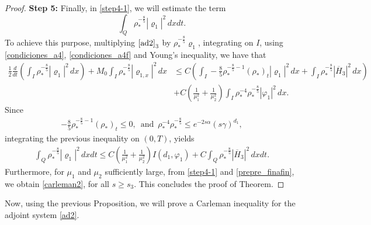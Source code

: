 \documentclass[11pt,a4paper]{amsart}
\numberwithin{equation}{section}
\begin{document}
\begin{proof}
\textbf{Step 5:} Finally, in \eqref{step4-1}, we will estimate the term
\begin{equation*}
\int_{Q}\rho^{-\frac{8}{5}}_{*}|\varrho_{1}|^{2}\,dxdt.
\end{equation*}To achieve this purpose, multiplying   $\eqref{ad2}_{3}$  by  $\rho^{-\frac{8}{5}}_{*}\varrho_{1}$, integrating on $I$, using \eqref{condiciones_a4}, \eqref{condiciones_a4f} and Young's inequality, we have that
\begin{equation*}
    \begin{split}
       \frac{1}{2}\frac{d}{dt}\left(\int_{I}\rho^{-\frac{8}{5}}_{*}|\varrho_{1}|^{2}\,dx \right)+M_{0}\int_{I}\rho^{-\frac{8}{5}}_{*}|\varrho_{1,x}|^{2}\,dx &\leq C \left(\int_{I}-\frac{8}{5}\rho^{-\frac{8}{5}-1}_{*}\left( \rho_{*}\right)_{t}|\varrho_{1}|^{2}\,dx+\int_{I}\rho^{-\frac{8}{5}}_{*}|\overline{H}_{3}|^{2}\,dx \right)\\
       &+C\left(\frac{1}{\mu^{2}_{1}}+\frac{1}{\mu^{2}_{2}}\right)\int_{I}\rho^{-4}_{\ast}\rho^{-\frac{8}{5}}_{*}|\varphi_{1}|^{2}\,dx.
    \end{split}
\end{equation*}Since
\begin{align*}
   -\frac{8}{5}\rho^{-\frac{8}{5}-1}_{*}\left( \rho_{*}\right)_{t}\leq 0, \, \, \, \text{and}\, \, \, \rho^{-4}_{\ast}\rho^{-\frac{8}{5}}_{*}\leq e^{-2s\alpha}(s\gamma)^{d_1}, 
\end{align*}integrating the previous inequality on $(0, T)$, yields
\begin{align}\label{prepre_finafin}
\int_{Q}\rho^{-\frac{8}{5}}_{*}|\varrho_1|^{2}\,dxdt \leq C\left(\frac{1}{\mu^{2}_{1}}+\frac{1}{\mu^{2}_{2}} \right)I(d_{1},\varphi_{1})+  C\int_{Q}\rho^{-\frac{8}{5}}_{*}|\overline{H}_{3}|^{2}\,dxdt.
\end{align}Furthermore, for $\mu_{1}$  and  $\mu_{2}$  sufficiently large, from \eqref{step4-1} and \eqref{prepre_finafin}, we obtain \eqref{carleman2}, for all $s\geq s_3$. This concludes the proof of Theorem. 
    
\end{proof}

 Now, using the previous Proposition, we will prove a Carleman inequality for the adjoint system \eqref{ad2}.
\end{document}
